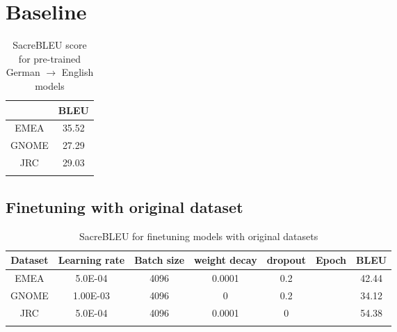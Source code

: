 \section{Baseline}

\begin{table}[h]
\centering
\begin{tabular}{cc}
\Xhline{3\arrayrulewidth}
        &  BLEU  \\\hline
EMEA  &  35.52     \\ 
GNOME  & 27.29       \\
JRC  &   29.03        \\\Xhline{3\arrayrulewidth}

\end{tabular}
\caption{SacreBLEU score for pre-trained German $\rightarrow$ English models}
\label{Tab:NMTresults}
\end{table}

\subsection{Finetuning with original dataset}

\begin{table}[h] 
\centering
\begin{tabular}{ccccccc}
\Xhline{3\arrayrulewidth}
Dataset & Learning rate & Batch size & weight decay  & dropout & Epoch  & BLEU \\\hline
EMEA & 5.0E-04 & 4096 & 0.0001 & 0.2 & &       42.44\\ 
GNOME & 1.00E-03 & 4096 & 0 & 0.2 & &    34.12               \\ 
JRC &5.0E-04 & 4096 & 0.0001 &0  & & 54.38       \\ \Xhline{3\arrayrulewidth}


\end{tabular}
\caption{SacreBLEU for finetuning models with original datasets}
\label{Tab:BLEU}
\end{table}